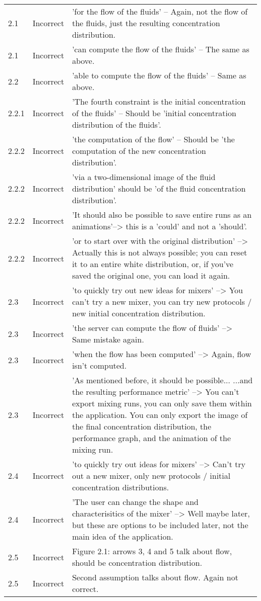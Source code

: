 \begin{longtable}{l|l|p{}}
2.1 & Incorrect & 'for the flow of the fluids' -- Again, not the flow of the fluids, just the resulting concentration distribution.\\
2.1 & Incorrect & 'can compute the flow of the fluids' -- The same as above. \\
2.2 & Incorrect & 'able to compute the flow of the fluids' -- Same as above. \\
2.2.1 & Incorrect & 'The fourth constraint is the initial concentration of the fluids' -- Should be 'initial concentration distribution of the fluids'. \\
2.2.2 & Incorrect & 'the computation of the flow' -- Should be 'the computation of the new concentration distribution'. \\
2.2.2 & Incorrect & 'via a two-dimensional image of the fluid distribution' should be 'of the fluid concentration distribution'.\\
2.2.2 & Incorrect & 'It should also be possible to save entire runs as an animations'--> this is a 'could' and not a 'should'. \\
2.2.2 & Incorrect & 'or to start over with the original distribution' --> Actually this is not always possible; you can reset it to an entire white
distribution, or, if you've saved the original one, you can load it again. \\
2.3 & Incorrect & 'to quickly try out new ideas for mixers' --> You can't try a new mixer, you can try new protocols / new initial concentration
distribution.\\
2.3 & Incorrect & 'the server can compute the flow of fluids' --> Same mistake again.\\
2.3 & Incorrect & 'when the flow has been computed' --> Again, flow isn't computed.\\
2.3 & Incorrect & 'As mentioned before, it should be possible... ...and the resulting performance metric' --> You can't export mixing runs, you can only save them within the application. You can only export the image of the final concentration distribution, the performance graph, and the animation of the mixing run.\\
2.4 & Incorrect & 'to quickly try out ideas for mixers' --> Can't try out a new mixer, only new protocols / initial concentration distributions.\\
2.4 & Incorrect & 'The user can change the shape and characterisitics of the mixer' --> Well maybe later, but these are options to be included later, not the main idea of the application.\\
2.5 & Incorrect & Figure 2.1: arrows 3, 4 and 5 talk about flow, should be concentration distribution.\\
2.5 & Incorrect & Second assumption talks about flow. Again not correct.\\
\end{longtable}

